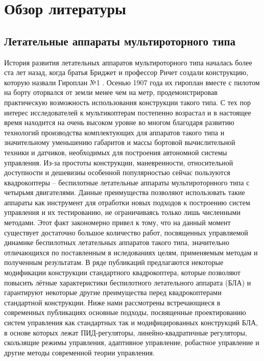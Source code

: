 

\chapter{Обзор литературы} \label{review}
\section{Летательные аппараты мультироторного типа} \label{review_s1}

История развития летательных аппаратов мультироторного типа началась более ста лет назад, когда братья Бриджет и профессор Ричет создали конструкцию, которую назвали Гироплан №1 \cite{Leishman02, Leishman01}. Осенью 1907 года их гироплан вместе с пилотом на борту оторвался от земли менее чем на метр, продемонстрировав практическую возможность использования конструкции такого типа. С тех пор интерес исследователей к мультикоптерам постепенно возрастал и в настоящее время находится на очень высоком уровне во многом благодаря развитию технологий производства комплектующих для аппаратов такого типа и значительному уменьшению габаритов и массы бортовой вычислительной техники и датчиков, необходимых для построения автономной системы управления. Из-за простоты конструкции, маневренности, относительной доступности и дешевизны особенной популярностью сейчас пользуются квадрокоптеры -- беспилотные летательные аппараты мультироторнного типа с четырьмя двигателями. Данные преимущества позволяют использовать такие аппараты как инструмент для отработки новых подходов к построению систем управления и их тестированию, не ограничиваясь только лишь численными методами. Этот факт закономерно привел к тому, что на данный момент существует достаточно большое количество работ, посвященных управляемой динамике беспилотных летательных аппаратов такого типа, значительно отличающихся по поставленным в иследованиях целям, применяемым методам и полученным результатам. В ряде публикаций предлагаются некоторые модификации конструкции стандартного квадрокоптера, которые позволяют повысить лётные характеристики беспилотного летательного аппарата (БЛА) и гарантируют некоторые другие преимущества перед квадрокоптерами стандартной конструкции. Ниже нами рассмотрены встречающиеся в современных публикациях основные подходы, посвященные проектированию систем управления как стандартных так и модифицированных конструкций БЛА, в основе которых лежат ПИД-регуляторы, линейно-квадратичные регуляторы, скользящие режимы управления, адаптивное управление, робастное управление и другие методы современной теории управления.

